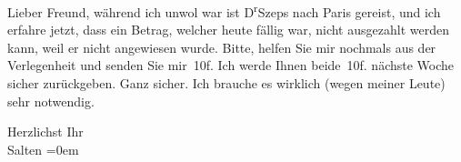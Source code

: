 \pstart{}Lieber Freund,\pend\vspace{0.5em}
\pstart
           während ich unwol war ist D\textsuperscript{r}Szeps nach Paris gereist,
               und ich erfahre jetzt, dass ein Betrag, welcher heute
               fällig war, nicht ausgezahlt werden kann, weil er nicht angewiesen wurde. Bitte,
               helfen Sie mir nochmals aus der Verlegenheit und senden Sie mir 10f. Ich werde Ihnen
               beide 10f. nächste Woche sicher zurückgeben. Ganz sicher. Ich brauche es wirklich
               (wegen meiner Leute) sehr notwendig.\pend
           
\pstart
           Herzlichst Ihr {\\[\baselineskip]}\spacefill\mbox{Salten}\pend
           \leftskip=0em{}\endnumbering{}  
      